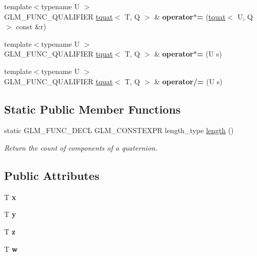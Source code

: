 \begin{DoxyCompactItemize}
{\footnotesize template$<$typename U $>$ }\\G\+L\+M\+\_\+\+F\+U\+N\+C\+\_\+\+Q\+U\+A\+L\+I\+F\+I\+ER \hyperlink{structglm_1_1tquat}{tquat}$<$ T, Q $>$ \& {\bfseries operator$\ast$=} (\hyperlink{structglm_1_1tquat}{tquat}$<$ U, Q $>$ const \&r)
\item 
\mbox{\label{structglm_1_1tquat_a753a68a2bea0f6504d982404c6824e38}} 
{\footnotesize template$<$typename U $>$ }\\G\+L\+M\+\_\+\+F\+U\+N\+C\+\_\+\+Q\+U\+A\+L\+I\+F\+I\+ER \hyperlink{structglm_1_1tquat}{tquat}$<$ T, Q $>$ \& {\bfseries operator$\ast$=} (U s)
\item 
\mbox{\label{structglm_1_1tquat_a08d66426ba503daea896ae95eb666299}} 
{\footnotesize template$<$typename U $>$ }\\G\+L\+M\+\_\+\+F\+U\+N\+C\+\_\+\+Q\+U\+A\+L\+I\+F\+I\+ER \hyperlink{structglm_1_1tquat}{tquat}$<$ T, Q $>$ \& {\bfseries operator/=} (U s)
\end{DoxyCompactItemize}
\subsection*{Static Public Member Functions}
\begin{DoxyCompactItemize}
\item 
\mbox{\label{structglm_1_1tquat_a7cf19acd1bf11bdf0f52dbc16b3dee53}} 
static G\+L\+M\+\_\+\+F\+U\+N\+C\+\_\+\+D\+E\+CL G\+L\+M\+\_\+\+C\+O\+N\+S\+T\+E\+X\+PR length\+\_\+type \hyperlink{structglm_1_1tquat_a7cf19acd1bf11bdf0f52dbc16b3dee53}{length} ()
\begin{DoxyCompactList}\small\item\em Return the count of components of a quaternion. \end{DoxyCompactList}\end{DoxyCompactItemize}
\subsection*{Public Attributes}
\begin{DoxyCompactItemize}
\item 
\mbox{\label{structglm_1_1tquat_a74fac4f3deda35413106feeae734641c}} 
T {\bfseries x}
\item 
\mbox{\label{structglm_1_1tquat_a09c876d49b2406fd50aca892f3637f0f}} 
T {\bfseries y}
\item 
\mbox{\label{structglm_1_1tquat_a81cfe33795e56627715972ad533605d4}} 
T {\bfseries z}
\item 
\mbox{\label{structglm_1_1tquat_a7e71715c0eb0b1cd8de24fc5012594bf}} 
T {\bfseries w}
\end{DoxyCompactItemize}


